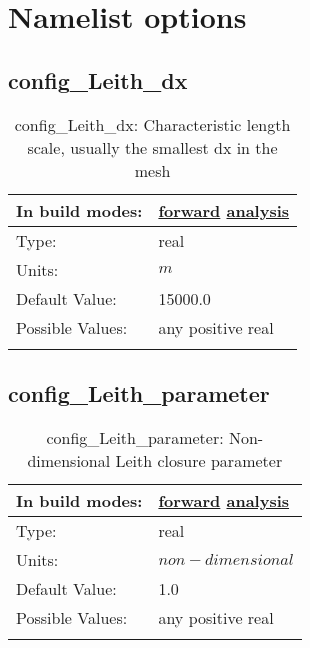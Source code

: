 \chapter[Namelist options]{Namelist options}
\label{chap:namelist_sections}
\section[config\_Leith\_dx]{config\_Leith\_dx}
\label{sec:nm_sec_config_Leith_dx}
\begin{center}
\begin{longtable}{| p{2.0in} || p{4.0in} |}
    \hline
    In build modes: & \hyperref[subsec:forward_nm_tab_hmix_Leith]{forward} \hyperref[subsec:analysis_nm_tab_hmix_Leith]{analysis} \\
    \hline
    Type: & real \\
    \hline
    Units: & $m$ \\
    \hline
    Default Value: & 15000.0 \\
    \hline
    Possible Values: & any positive real \\
    \hline
    \caption{config\_Leith\_dx: Characteristic length scale, usually the smallest dx in the mesh}
\end{longtable}
\end{center}
\section[config\_Leith\_parameter]{config\_Leith\_parameter}
\label{sec:nm_sec_config_Leith_parameter}
\begin{center}
\begin{longtable}{| p{2.0in} || p{4.0in} |}
    \hline
    In build modes: & \hyperref[subsec:forward_nm_tab_hmix_Leith]{forward} \hyperref[subsec:analysis_nm_tab_hmix_Leith]{analysis} \\
    \hline
    Type: & real \\
    \hline
    Units: & $non-dimensional$ \\
    \hline
    Default Value: & 1.0 \\
    \hline
    Possible Values: & any positive real \\
    \hline
    \caption{config\_Leith\_parameter: Non-dimensional Leith closure parameter}
\end{longtable}
\end{center}
